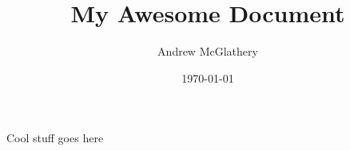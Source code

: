 \documentclass[12pt]{article}
\title{My Awesome Document}
\author{Andrew McGlathery}
\date{\today}
\begin{document}
  \maketitle
  Cool stuff goes here\cite{wallach2006topic}
  
\end{document}
